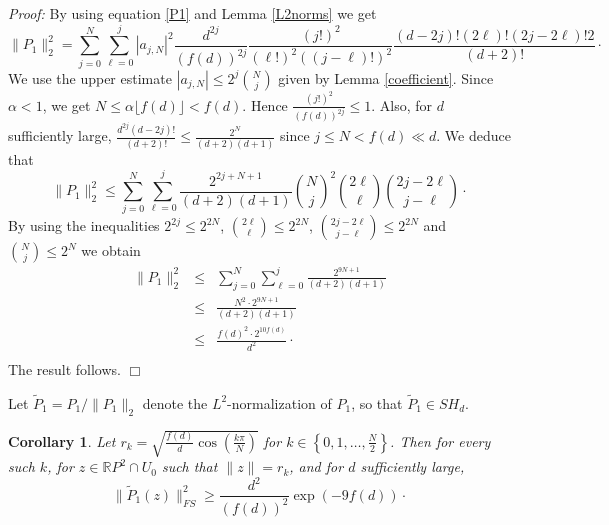 \documentclass [11pt]{amsart}
\newtheorem {corollary}[theorem]{Corollary}
\theoremstyle{remark}
\numberwithin{equation}{section}
\numberwithin{theorem}{section}
\begin{document}
\noindent \textit{Proof:} By using equation \eqref{P1} and Lemma \ref{L2norms} we get 
\[  \|P_{1}\|_{2}^2 = \sum_{j=0}^{N} \sum_{\ell=0}^{j}   |a_{j,N}|^2  \frac{d^{2j}}{(f(d))^{2j}} \frac{ (j!)^2}{(\ell !)^2((j-\ell)!)^2} \frac{(d-2j)! (2\ell)! (2j-2\ell)! 2}{(d+2)!}\cdot  \] 
We use the upper estimate $\displaystyle{|a_{j,N}|\leq 2^{j}{N\choose j}}$ given by Lemma \ref{coefficient}. Since $\alpha<1$, we get $N\leq \alpha\lfloor f(d)\rfloor < f(d)$. Hence $\displaystyle{  \frac{ (j!)^2}{(f(d))^{2j}}\leq 1}$. Also, for $d$ sufficiently large, $\displaystyle{ \frac{d^{2j}(d-2j)!}{(d+2)!}\leq \frac{2^N}{(d+2)(d+1)}}$ since $j\leq N<f(d)\ll d$.  We deduce that 
\[  \|P_{1}\|_{2}^{2} \leq \sum_{j=0}^{N} \sum_{\ell=0}^{j}   \frac{2^{2j+N+1}}{(d+2)(d+1)} {N \choose j}^2 {2\ell \choose \ell} {2j-2\ell \choose j-\ell}\cdot  \]
By using the inequalities $\displaystyle{2^{2j}\leq 2^{2N}}$,  $\displaystyle{ {2\ell \choose \ell}\leq 2^{2N}}$, $\displaystyle{ {2j-2\ell \choose j-\ell}\leq 2^{2N}}$ and $\displaystyle{ {N \choose j}\leq 2^N}$ we obtain 
\begin{eqnarray*} 
\|P_{1}\|_{2}^2 &\leq&    \sum_{j=0}^{N} \sum_{\ell=0}^{j}   \frac{2^{9N+1}}{(d+2)(d+1)}   \\
&\leq&   \frac{N^2\cdot  2^{9N+1}}{(d+2)(d+1)}  \\
&\leq&  \frac{f(d)^2\cdot  2^{10f(d)}}{d^2} \cdot \\
\end{eqnarray*}
\noindent The result follows. \hfill $\Box$ 

Let $\displaystyle{\widetilde{P}_{1}=P_{1}/\|P_{1}\|_{2}}$ denote the $L^2$-normalization of $P_{1}$, so that $\widetilde{P}_{1}\in SH_{d}$.  

\begin{corollary} \label{P1FS}
Let $\displaystyle{r_{k}= \sqrt{\frac{f(d)}{d} \cos\left(\frac{k\pi}{N}\right)}}$ for  $\displaystyle{ k\in \left\{0,1,\ldots, \frac{N}{2}\right\}}$. Then for every such $k$, for $z\in \mathbb{R}P^2\cap U_{0}$ such that $\|z\|=r_{k}$, and for $d$ sufficiently large, 
\[  \|\widetilde{P}_{1}(z)\|_{FS}^2\geq \frac{d^2}{(f(d))^2}\exp(-9f(d))\cdot \] 
\end{corollary} 
\end{document}
